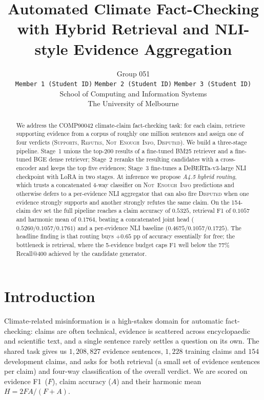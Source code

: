 \documentclass[11pt]{article}
\title{Automated Climate Fact-Checking with Hybrid Retrieval and
NLI-style Evidence Aggregation}
\author{
  Group 051 \\
  \texttt{Member 1 (Student ID)} \quad
  \texttt{Member 2 (Student ID)} \quad
  \texttt{Member 3 (Student ID)} \\
  School of Computing and Information Systems \\
  The University of Melbourne \\
}
\begin{document}
\maketitle

\begin{abstract}
We address the COMP90042 climate-claim fact-checking task: for each
claim, retrieve supporting evidence from a corpus of roughly one
million sentences and assign one of four verdicts
(\textsc{Supports}, \textsc{Refutes}, \textsc{Not~Enough~Info},
\textsc{Disputed}). We build a three-stage pipeline. Stage~1 unions the
top-200 results of a fine-tuned BM25 retriever and a fine-tuned BGE
dense retriever; Stage~2 reranks the resulting candidates with a
cross-encoder and keeps the top five evidences; Stage~3 fine-tunes a
DeBERTa-v3-large NLI checkpoint with LoRA in two stages. At inference
we propose \emph{A4.5 hybrid routing}, which trusts a concatenated
4-way classifier on \textsc{Not~Enough~Info} predictions and otherwise
defers to a per-evidence NLI aggregator that can also fire
\textsc{Disputed} when one evidence strongly supports and another
strongly refutes the same claim. On the 154-claim dev set the full
pipeline reaches a claim accuracy of $0.5325$, retrieval F1 of
$0.1057$ and harmonic mean of $0.1764$, beating a concatenated joint
head ($0.5260 / 0.1057 / 0.1761$) and a per-evidence NLI baseline
($0.4675 / 0.1057 / 0.1725$). The headline finding is that routing
buys $+0.65$ pp of accuracy essentially for free; the bottleneck is
retrieval, where the 5-evidence budget caps F1 well below the
77\% Recall@400 achieved by the candidate generator.
\end{abstract}

\section{Introduction}

Climate-related misinformation is a high-stakes domain for automatic
fact-checking: claims are often technical, evidence is scattered
across encyclopaedic and scientific text, and a single sentence
rarely settles a question on its own. The shared task gives us
$1{,}208{,}827$ evidence sentences, $1{,}228$ training claims and
$154$ development claims, and asks for both retrieval (a small set of
evidence sentences per claim) and four-way classification of the
overall verdict. We are scored on evidence F1~($F$), claim accuracy
($A$) and their harmonic mean $H = 2FA/(F+A)$.
\end{document}

